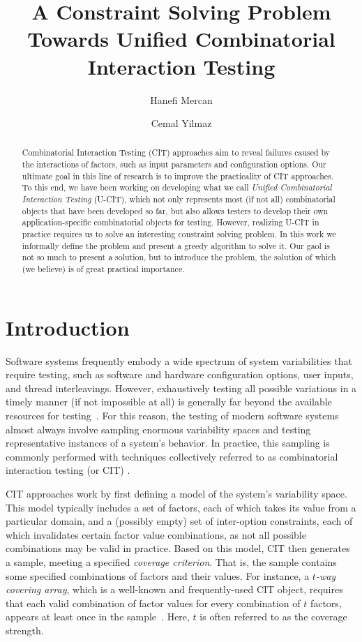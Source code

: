 \documentclass[EPiC]{easychair}
\title{A Constraint Solving Problem Towards Unified Combinatorial Interaction Testing}
\author{ Hanefi Mercan \and Cemal Yilmaz }
\institute{
  Faculty of Engineering and Natural Sciences,\\
  Sabanci University, Istanbul, Turkey\\
  \email{\{hanefimercan,cyilmaz\}@sabanciuniv.edu}
 }
\begin{document}
\maketitle

\begin{abstract}
Combinatorial Interaction Testing (CIT) approaches aim to reveal failures caused by the interactions of factors, such as input parameters and configuration options. Our ultimate goal in this line of research is to improve the practicality of CIT approaches. To this end, we have been working on developing what we call {\em Unified Combinatorial Interaction Testing} (U-CIT), which not only represents most (if not all) combinatorial objects that have been developed so far, but also allows testers to develop their own application-specific combinatorial objects for testing. However, realizing U-CIT in practice requires us to solve an interesting constraint solving problem. In this work we informally define the problem and present a greedy algorithm to solve it. Our gaol is not so much to present a solution, but to introduce the problem, the solution of which (we believe) is of great practical importance.
\end{abstract}

\section{Introduction}
\label{intro}

Software systems frequently embody a wide spectrum of system variabilities that require testing, such as software and hardware configuration options, user inputs, and thread interleavings. However, exhaustively testing all possible variations in a timely manner (if not impossible at all) is generally far beyond the available resources for testing~\cite{yilmaz2014moving}. For this reason, the testing of modern software systems almost always involve sampling enormous variability spaces and testing representative instances of a system's behavior. In practice, this sampling is commonly performed with techniques collectively referred to as combinatorial interaction testing (or CIT) \cite{yilmaz2014moving,nie2011survey}. 

CIT approaches work by first defining a model of the system's
variability space. This model typically includes a set of factors, each of which takes its value from a particular domain, and a (possibly empty) set of inter-option constraints, each of which invalidates certain factor value combinations, as not all possible combinations may be valid in practice. Based on this model, CIT then generates a sample, meeting a specified \emph{coverage criterion}. That is, the sample contains some specified combinations of factors and their values. For instance, a {\em $t$-way covering array}, which is a well-known and frequently-used CIT object, requires that each valid combination of factor values for every combination of $t$ factors, appears at least once in the sample~\cite{cohen1997aetg}. Here, $t$ is often referred to as the coverage strength. 
\end{document}
